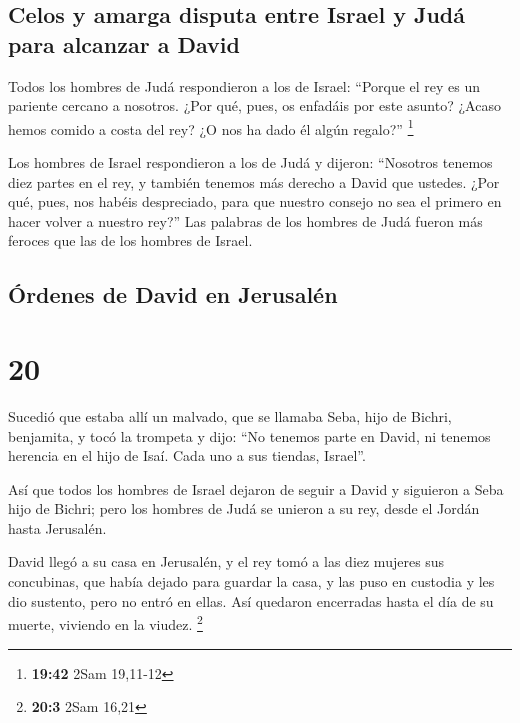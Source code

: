 \hypertarget{celos-y-amarga-disputa-entre-israel-y-juduxe1-para-alcanzar-a-david}{%
\subsection{Celos y amarga disputa entre Israel y Judá para alcanzar a
David}\label{celos-y-amarga-disputa-entre-israel-y-juduxe1-para-alcanzar-a-david}}

 Todos los hombres de Judá respondieron a los de Israel:
``Porque el rey es un pariente cercano a nosotros. ¿Por qué, pues, os
enfadáis por este asunto? ¿Acaso hemos comido a costa del rey? ¿O nos ha
dado él algún regalo?'' \footnote{\textbf{19:42} 2Sam 19,11-12}

 Los hombres de Israel respondieron a los de Judá y
dijeron: ``Nosotros tenemos diez partes en el rey, y también tenemos más
derecho a David que ustedes. ¿Por qué, pues, nos habéis despreciado,
para que nuestro consejo no sea el primero en hacer volver a nuestro
rey?'' Las palabras de los hombres de Judá fueron más feroces que las de
los hombres de Israel.

\hypertarget{uxf3rdenes-de-david-en-jerusaluxe9n}{%
\subsection{Órdenes de David en
Jerusalén}\label{uxf3rdenes-de-david-en-jerusaluxe9n}}

\hypertarget{section-19}{%
\section{20}\label{section-19}}

 Sucedió que estaba allí un malvado, que se llamaba Seba,
hijo de Bichri, benjamita, y tocó la trompeta y dijo: ``No tenemos parte
en David, ni tenemos herencia en el hijo de Isaí. Cada uno a sus
tiendas, Israel''.

 Así que todos los hombres de Israel dejaron de seguir a
David y siguieron a Seba hijo de Bichri; pero los hombres de Judá se
unieron a su rey, desde el Jordán hasta Jerusalén.

 David llegó a su casa en Jerusalén, y el rey tomó a las
diez mujeres sus concubinas, que había dejado para guardar la casa, y
las puso en custodia y les dio sustento, pero no entró en ellas. Así
quedaron encerradas hasta el día de su muerte, viviendo en la viudez.
\footnote{\textbf{20:3} 2Sam 16,21}

